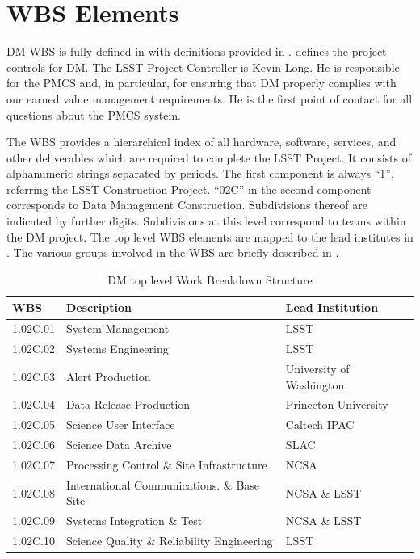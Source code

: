 \section{WBS Elements } \label{sect:WBS}

DM WBS is fully defined in  with definitions provided in . 
 defines the project controls for DM. The LSST Project Controller is Kevin Long. He is responsible for the PMCS and, in particular, for ensuring that DM properly complies with
our earned value management requirements. He is the first point of contact for
all questions about the PMCS system.


The WBS provides a hierarchical index of all hardware, software, services, and
other deliverables which are required to complete the LSST Project. It
consists of alphanumeric strings separated by periods. The first component is
always “1”, referring the LSST Construction Project. “02C” in the second
component corresponds to Data Management Construction. Subdivisions thereof
are indicated by further digits. Subdivisions at this level correspond to
teams within the DM project. The top level WBS elements are mapped to the lead institutes in .
The various groups involved in the WBS are briefly described in .

\begin{table}
\caption{DM top level Work Breakdown Structure \label{tab:wbs}}
\begin{tabular}[htb]{l|l|l}\\ \hline
{\bf WBS}    &  {\bf Description}   &                            {\bf Lead Institution}\\ \hline
	1.02C.01& System Management                       &  LSST\\ \hline
	1.02C.02& Systems Engineering                     &  LSST\\ \hline
	1.02C.03& Alert Production                        &  University of Washington\\ \hline
	1.02C.04& Data Release Production                 &  Princeton University\\ \hline
	1.02C.05& Science User Interface                  &  Caltech IPAC\\ \hline
	1.02C.06& Science Data Archive                    &  SLAC\\ \hline
	1.02C.07& Processing Control \& Site Infrastructure & NCSA\\ \hline
	1.02C.08& International Communications. \& Base Site& NCSA \& LSST\\ \hline
	1.02C.09& Systems Integration \& Test               & NCSA \& LSST\\ \hline
	1.02C.10& Science Quality \& Reliability Engineering& LSST\\ \hline
\end{tabular}
\end{table}


